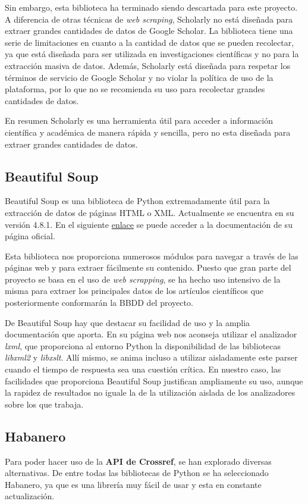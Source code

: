 Sin embargo, esta biblioteca ha terminado siendo descartada para este proyecto. A diferencia de otras técnicas de \textit{web scraping}, Scholarly no está diseñada para extraer grandes cantidades de datos de Google Scholar. La biblioteca tiene una serie de limitaciones en cuanto a la cantidad de datos que se pueden recolectar, ya que está diseñada para ser utilizada en investigaciones científicas y no para la extracción masiva de datos. Además, Scholarly está diseñada para respetar los términos de servicio de Google Scholar y no violar la política de uso de la plataforma, por lo que no se recomienda su uso para recolectar grandes cantidades de datos.

En resumen Scholarly es una herramienta útil para acceder a información científica y académica de manera rápida y sencilla, pero no esta diseñada para extraer grandes cantidades de datos.

\subsection{Beautiful Soup}
Beautiful Soup es una biblioteca de Python extremadamente útil para la extracción de datos de páginas HTML o XML. Actualmente se encuentra en su versión 4.8.1. En el siguiente \href{https://beautiful-soup-4.readthedocs.io/en/latest/}{enlace} se puede acceder a la documentación de su página oficial. 

Esta biblioteca nos proporciona numerosos módulos para navegar a través de las páginas web y para extraer fácilmente su contenido. Puesto que gran parte del proyecto se basa en el uso de \textit{web scrapping}, se ha hecho uso intensivo de la misma para extraer los principales datos de los artículos científicos que posteriormente conformarán la BBDD del proyecto.

De Beautiful Soup hay que destacar su facilidad de uso y la amplia documentación que aporta. En su página web nos aconseja utilizar el analizador \textit{lxml}, que proporciona al entorno Python la disponibilidad de las bibliotecas \textit{libxml2} y \textit{libxslt}. Allí mismo, se anima incluso a utilizar aisladamente este parser cuando el tiempo de respuesta sea una cuestión crítica. En nuestro caso, las facilidades que proporciona Beautiful Soup justifican ampliamente su uso, aunque la  rapidez de resultados no iguale la de la utilización aislada de los analizadores sobre los que trabaja.
 

\subsection{Habanero}
Para poder hacer uso de la \textbf{API de Crossref}, se han explorado diversas alternativas. De entre todas las bibliotecas de Python se ha seleccionado Habanero, ya que es una librería muy fácil de usar y esta en constante actualización.

